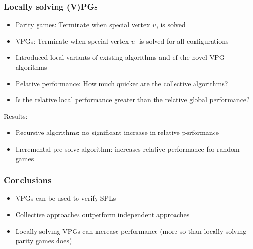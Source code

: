 \documentclass[aspectratio=169]{beamer}
\begin{document}

\begin{frame}[t]
\frametitle{Locally solving (V)PGs}
\begin{itemize}
	\item Parity games: Terminate when special vertex $v_0$ is solved
	\item VPGs: Terminate when special vertex $v_0$ is solved for all configurations\pause
	\item Introduced local variants of existing algorithms and of the novel VPG algorithms\pause
	\item Relative performance: How much quicker are the collective algorithms?
	\item Is the relative local performance greater than the relative global performance?
\end{itemize}\pause
\large Results:
\begin{itemize}
	\item Recursive algorithms: no significant increase in relative performance
	\item Incremental pre-solve algorithm: increases relative performance for random games
\end{itemize}
\end{frame}


\begin{frame}[t]
\frametitle{Conclusions}
\begin{itemize}
	\item VPGs can be used to verify SPLs
	\item Collective approaches outperform independent approaches
	\item Locally solving VPGs can increase performance (more so than locally solving parity games does)
\end{itemize}
\end{frame}


\begin{frame}[t]
\end{frame}

\end{document}
